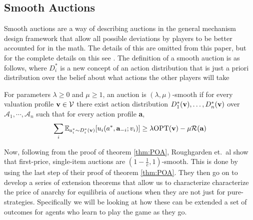 \documentclass[12pt,twoside]{reedthesis}
\begin{document}
\subsection{Smooth Auctions}

Smooth auctions are a way of describing auctions in the general mechanism design framework that allow all possible deviations by players to be better accounted for in the math. The details of this are omitted from this paper, but for the complete details on this see \citet{Roughgarden2017}. The definition of a smooth auction is as follows, where $D^*_i$ is a new concept of an action distribution that is just a priori distribution over the belief about what actions the other players will take 

\begin{dfn}
	For parameters $\lambda \geq 0$ and $\mu \geq 1$, an auction is $(\lambda, \mu)$-smooth if for every valuation profile $\textbf{v} \in \mathcal{V}$ there exist action distribution $D_1^{*}(\textbf{v}), \ldots , D_n^*(\textbf{v})$ over $\mathcal{A}_1, \cdots, \mathcal{A}_n$ such that for every action profile \textbf{a},
	$$ \sum_i \mathbb{E}_{a_i^* \sim D_i^*(\textbf{v})}[u_i(a^*, \textbf{a}_{-i};v_i)] \geq \lambda \text{OPT}(\textbf{v}) - \mu \mathcal{R}(\textbf{a})$$
	\label{dfn:smoothauction}
\end{dfn}

 Now, following from the proof of theorem \ref{thm:POA}, Roughgarden et.~al show that first-price, single-item auctions are $(1-\frac{1}{e}, 1)$-smooth. This is done by using the last step of their proof of theorem \ref{thm:POA}. They then go on to develop a series of extension theorems that allow us to characterize characterize the price of anarchy for equilibria of auctions when they are not just for pure-strategies. Specifically we will be looking at how these can be extended a set of outcomes for agents who learn to play the game as they go.

\end{document}
